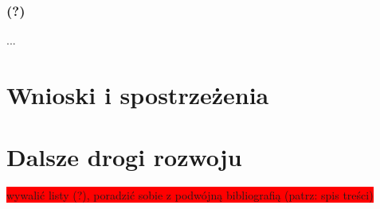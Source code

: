 \documentclass[twoside]{iisthesis}
\newcommand{\todo}{\colorbox{red}}
\begin{document}
\subsection{(?)}
...

\chapter{Wnioski i spostrzeżenia}
\chapter{Dalsze drogi rozwoju}



\pagestyle{plain}

\todo{wywalić listy (?), poradzić sobie z podwójną bibliografią (patrz: spis treści)}

\listoffigures
\listoftables
{}



\end{document}
